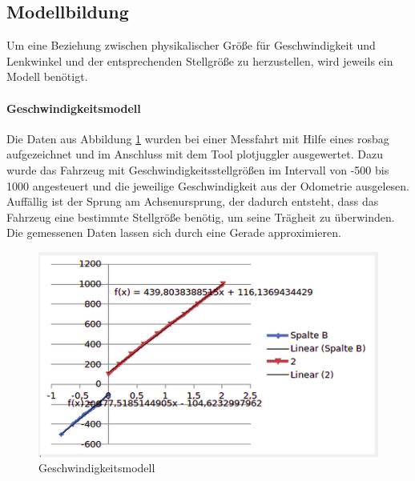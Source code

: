 \subsection{Modellbildung}
\label{subsec:02modellbildung}
Um eine Beziehung zwischen physikalischer Gr\"o\ss{}e f\"ur Geschwindigkeit und Lenkwinkel und der entsprechenden Stellgr\"o\ss{}e zu herzustellen, wird jeweils ein Modell ben\"otigt.
\paragraph{Geschwindigkeitsmodell} %
Die Daten aus Abbildung \ref{fig:velocity_profile} wurden bei einer Messfahrt mit Hilfe eines rosbag aufgezeichnet und im Anschluss mit dem Tool plotjuggler ausgewertet. Dazu wurde das Fahrzeug mit Geschwindigkeitsstellgr\"o\ss{}en im Intervall von -500 bis 1000 angesteuert und die jeweilige Geschwindigkeit aus der Odometrie ausgelesen. Auff\"allig ist der Sprung am Achsenursprung, der dadurch entsteht, dass das Fahrzeug eine bestimmte Stellgr\"o\ss{}e ben\"otig, um seine Tr\"agheit zu \"uberwinden.
Die gemessenen Daten lassen sich durch eine Gerade approximieren.

\begin{figure}[h] %
\centering
\includegraphics[width=0.7\linewidth]{pics/velocity_profile}
\caption{Geschwindigkeitsmodell}
\label{fig:velocity_profile}
\end{figure}

